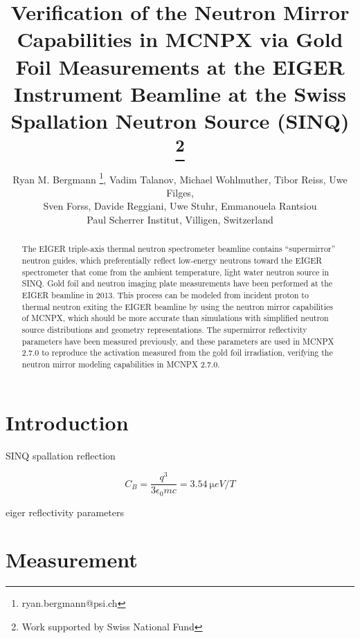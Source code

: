 \documentclass[a4paper,
              ]{jacow}
\begin{document}
\title{Verification of the Neutron Mirror Capabilities in MCNPX via Gold Foil Measurements at the EIGER Instrument Beamline at the Swiss Spallation Neutron Source (SINQ) \thanks{Work supported by Swiss National Fund}}

\author{Ryan M. Bergmann \thanks{ryan.bergmann@psi.ch}, Vadim Talanov, Michael Wohlmuther, Tibor Reiss, Uwe Filges, \\ Sven Forss, Davide Reggiani, Uwe Stuhr, Emmanouela Rantsiou\\ Paul Scherrer Institut, Villigen, Switzerland\\}

\maketitle

%
\begin{abstract}
   The EIGER triple-axis thermal neutron spectrometer beamline contains “supermirror” neutron guides, which preferentially reflect low-energy neutrons toward the EIGER spectrometer that come from the ambient temperature, light water neutron source in SINQ.  Gold foil and neutron imaging plate measurements have been performed at the EIGER beamline in 2013.  This process can be modeled from incident proton to thermal neutron exiting the EIGER beamline by using the neutron mirror capabilities of MCNPX, which should be more accurate than simulations with simplified neutron source distributions and geometry representations.  The supermirror reflectivity parameters have been measured previously, and these parameters are used in MCNPX 2.7.0 to reproduce the activation measured from the gold foil irradiation, verifying the neutron mirror modeling capabilities in MCNPX 2.7.0.
\end{abstract}


\section{Introduction}

SINQ spallation
reflection

\begin{equation}\label{eq:units}
    C_B=\frac{q^3}{3\epsilon_{0} mc}=\SI{3.54}{\micro eV/T}
\end{equation}

eiger reflectivity parameters


\section{Measurement}
\end{document}
